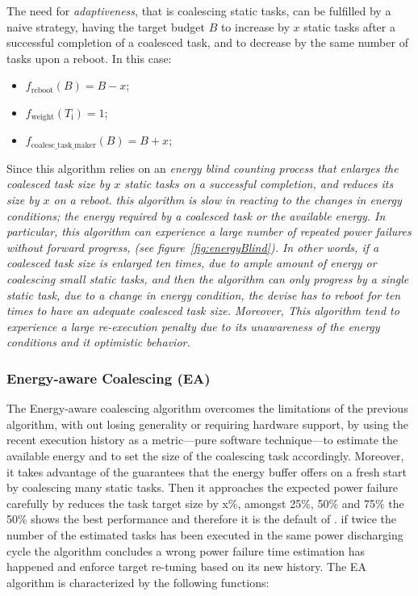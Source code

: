 The need for \emph{adaptiveness}, that is coalescing static tasks, can be fulfilled by a naive strategy, having the target budget $B$ to increase by $x$ static tasks after a successful completion of a coalesced task, and to decrease by the same number of tasks upon a reboot. In this case: 
\begin{itemize}
\item $f_\text{reboot}(B) = B - x $;
\item $f_\text{weight}(T_\text{i}) =  1$; 
\item $f_\text{coalesc\_task\_maker}(B) = B + x$; 
\end{itemize}
Since this algorithm relies on an \em{energy blind counting process} that enlarges the coalesced task size by $x$ static tasks on a successful completion, and reduces its size by $x$ on a reboot. this algorithm is slow in reacting to the changes in energy conditions; the energy required by a coalesced task or the available energy. In particular, this algorithm can experience a large number of \emph{repeated power} failures without forward progress, (see figure~\ref{fig:energyBlind}). In other words, if a coalesced task size is enlarged ten times, due to ample amount of energy or coalescing small static tasks, and then the algorithm can only progress by a single static task, due to a change in energy condition, the devise has to reboot for ten times to have an adequate coalesced task size. Moreover, This algorithm tend to experience a large re-execution penalty due to its unawareness of the energy conditions and it optimistic behavior. 

\subsubsection{Energy-aware Coalescing (EA)}
\label{subsec:ECoalescing}
The Energy-aware coalescing algorithm overcomes the limitations of the previous algorithm, with out losing generality or requiring hardware support, by using the recent execution history as a metric---pure software technique---to estimate the available energy and to set the size of the coalescing task accordingly. Moreover, it takes advantage of the guarantees that the energy buffer offers on a fresh start by coalescing many static tasks. Then it approaches the expected power failure carefully by reduces the task target size by x\%, amongst 25\%, 50\% and 75\% the 50\% shows the best performance and therefore it is the default of \sys. if twice the number of the estimated tasks has been executed in the same power discharging cycle the algorithm concludes a wrong power failure time estimation has happened and enforce target re-tuning based on its new history. The EA algorithm is characterized by the following functions: 

